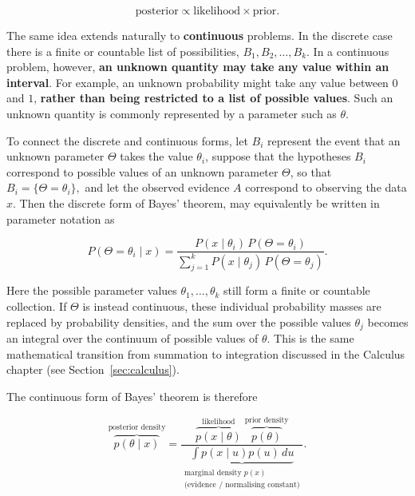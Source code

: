 \begin{equation}
    \boxed{
    \text{posterior}
    \propto
    \text{likelihood}
    \times
    \text{prior}
    }.
\end{equation}

The same idea extends naturally to \textbf{continuous} problems. In the discrete case there is a finite or countable list of possibilities, $B_1,B_2,\ldots,B_k$. In a continuous problem, however, \textbf{an unknown quantity may take any value within an interval}. For example, an unknown probability might take any value between $0$ and $1$, \textbf{rather than being restricted to a list of possible values}. Such an unknown quantity is commonly represented by a parameter such as $\theta$.

To connect the discrete and continuous forms, let $B_i$ represent the event
that an unknown parameter $\Theta$ takes the value $\theta_i$, suppose that the hypotheses $B_i$ correspond to possible values of an unknown parameter $\Theta$, so that $B_i=\{\Theta=\theta_i\},$ and let the observed evidence $A$ correspond to observing the data $x$.
Then the discrete form of Bayes' theorem, may equivalently be written in parameter notation as

\[
P(\Theta=\theta_i\mid x)
=
\frac{
P(x\mid\theta_i)\,P(\Theta=\theta_i)
}{
\displaystyle
\sum_{j=1}^{k}
P(x\mid\theta_j)\,P(\Theta=\theta_j)
}.
\]

Here the possible parameter values $\theta_1,\ldots,\theta_k$ still form a
finite or countable collection. If $\Theta$ is instead continuous, these individual probability masses are replaced by probability densities, and the sum over the possible values $\theta_j$ becomes an integral over the continuum of possible values of $\theta$. This is the same mathematical transition from summation to integration discussed in the Calculus chapter (see Section~\ref{sec:calculus}).

The continuous form of Bayes' theorem is therefore

\begin{equation}
\boxed{
\overbrace{p(\theta\mid x)}^{\text{posterior density}}
=
\frac{
    \overbrace{p(x\mid\theta)}^{\text{likelihood}}
    \;
    \overbrace{p(\theta)}^{\text{prior density}}
}{
    \underbrace{
    \displaystyle\int p(x\mid u)p(u)\,du
    }_{
    \substack{
    \text{marginal density }p(x)\\
    \text{(evidence / normalising constant)}
    }
    }
}
}.
\label{eq:continuous_bayes}
\end{equation}

